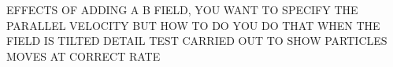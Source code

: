 %
%
%
%
%
%





EFFECTS OF ADDING A B FIELD, YOU WANT TO SPECIFY THE PARALLEL VELOCITY BUT HOW TO DO YOU DO THAT WHEN THE FIELD IS TILTED
DETAIL TEST CARRIED OUT TO SHOW PARTICLES MOVES AT CORRECT RATE

